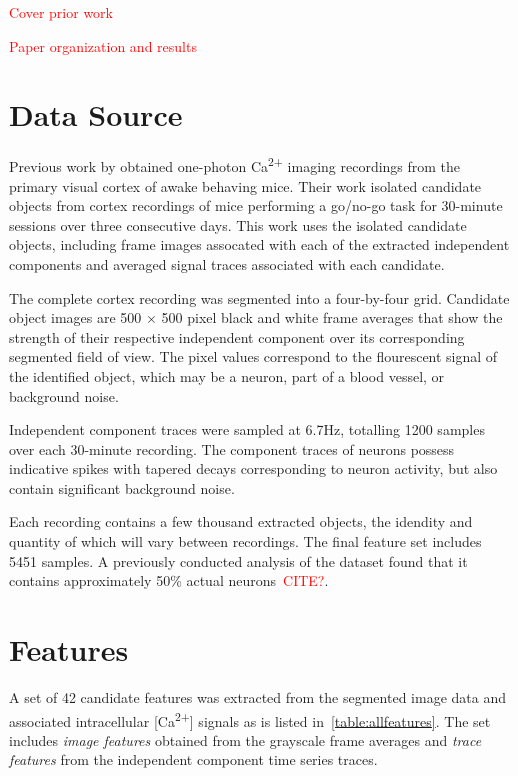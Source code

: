 \documentclass[10pt]{article}
\newcommand{\calcium}[0]{Ca\textsuperscript{2+}}
\newcommand{\todo}[1]{\textcolor{red}{#1}}
\begin{document}
\todo{Cover prior work}

\todo{Paper organization and results}


\section{Data Source}

Previous work by \citeauthor{Mukamel2009} obtained one-photon {\calcium} imaging recordings from the primary visual cortex of awake behaving mice.
Their work isolated candidate objects from cortex recordings of mice performing a go/no-go task for \num{30}-minute sessions over three consecutive days.
This work uses the isolated candidate objects, including frame images assocated with each of the extracted independent components and averaged signal traces associated with each candidate.

The complete cortex recording was segmented into a four-by-four grid.
Candidate object images are \num{500} $\times$ \num{500} pixel black and white frame averages that show the strength of their respective independent component over its corresponding segmented field of view. 
The pixel values correspond to the flourescent signal of the identified object, which may be a neuron, part of a blood vessel, or background noise.

Independent component traces were sampled at \num{6.7}\si{Hz}, totalling \num{1200} samples over each \num{30}-minute recording. The component traces of neurons possess indicative spikes with tapered decays corresponding to neuron activity, but also contain significant background noise.

Each recording contains a few thousand extracted objects, the idendity and quantity of which will vary between recordings.
The final feature set includes \num{5451} samples.
A previously conducted analysis of the dataset found that it contains approximately 50\% actual neurons~\todo{CITE?}.

\section{Features}

A set of \num{42} candidate features was extracted from the segmented image data and associated intracellular [\calcium] signals as is listed in~\cref{table:allfeatures}.
The set includes \emph{image features} obtained from the grayscale frame averages and \emph{trace features} from the independent component time series traces.
\end{document}
